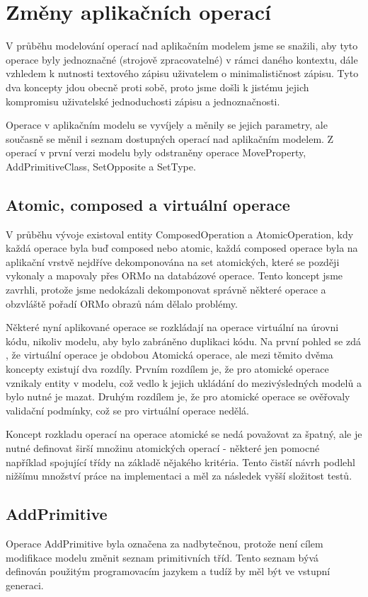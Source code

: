 \documentclass[11pt,twoside,a4paper]{book}
\begin{document}
\section{Změny aplikačních operací}
V průběhu modelování operací nad aplikačním modelem jsme se snažili, aby tyto
operace byly jednoznačné (strojově zpracovatelné) v rámci daného kontextu, dále
vzhledem k nutnosti textového zápisu uživatelem o minimalističnost zápisu. Tyto
dva koncepty jdou obecně proti sobě, proto jsme došli k jistému jejich
kompromisu uživatelské jednoduchosti zápisu a jednoznačnosti.

Operace v aplikačním modelu se vyvíjely a měnily se jejich parametry, ale
současně se měnil i seznam dostupných operací nad aplikačním modelem. Z operací
v první verzi modelu byly odstraněny operace MoveProperty, AddPrimitiveClass,
SetOpposite a SetType.

\subsection{Atomic, composed a virtuální operace}
V průběhu vývoje existoval entity ComposedOperation a AtomicOperation, kdy
každá operace byla buď composed nebo atomic, každá composed operace byla na
aplikační vrstvě nejdříve dekomponována na set atomických, které se později
vykonaly a mapovaly přes ORMo na databázové operace. Tento koncept jsme zavrhli,
protože jsme nedokázali dekomponovat správně některé operace a obzvláště
pořadí ORMo obrazů nám dělalo problémy. 

Některé nyní aplikované operace se rozkládají na operace virtuální na úrovni
kódu, nikoliv modelu, aby bylo zabráněno duplikaci kódu. Na první pohled se zdá
, že virtuální operace je obdobou Atomická operace, ale mezi těmito dvěma
koncepty existují dva rozdíly. Prvním rozdílem je, že pro atomické operace
vznikaly entity v modelu, což vedlo k jejich ukládání do mezivýsledných modelů a
bylo nutné je mazat. Druhým rozdílem je, že pro atomické operace se ověřovaly
validační podmínky, což se pro virtuální operace nedělá.

Koncept rozkladu operací na operace atomické se nedá považovat za špatný, ale je
nutné definovat širší množinu atomických operací - některé jen pomocné například
spojující třídy na základě nějakého kritéria. Tento čistší návrh podlehl nižšímu
množství práce na implementaci a měl za následek vyšší složitost testů.

\subsection{AddPrimitive} 
Operace AddPrimitive byla označena za nadbytečnou, protože není cílem modifikace
modelu změnit seznam primitivních tříd. Tento seznam bývá definován použitým
programovacím jazykem a tudíž by měl být ve vstupní generaci.
\end{document}
